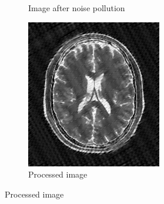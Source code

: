 \documentclass[UTF8]{ctexart}
\begin{document}
\begin{figure}[htbp]
\begin{subfigure}{0.3\textwidth}
        \caption{Image after noise pollution}
    \end{subfigure}%
    \hfill
    \begin{subfigure}{0.3\textwidth}
        \centering
        \includegraphics[width=\linewidth]{brain_cleaned.png}
        \caption{Processed image}
    
    \end{subfigure}


\end{figure}
\end{document}
